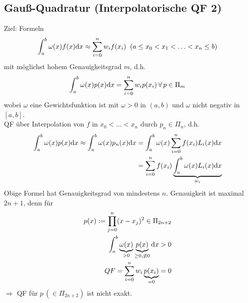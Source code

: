 \subsection{Gauß-Quadratur (Interpolatorische QF 2)}
Ziel: Formeln
\begin{align*}
  \int_a^b \omega(x) f(x) \mathrm{d}x \approx \sum\limits_{i=0}^{n}{w_i f(x_i)}\;\;(a \leq x_0 < x_1 < \ldots < x_n \leq b)
\end{align*}
mit möglichst hohem Genauigkeitsgrad $m$, d.h. 
\begin{align*}
  \int_a^b \omega(x) p(x) \mathrm{d}x = \sum\limits_{i=0}^{n}{w_i p(x_i)}\,\forall\, p \in \Pi_m
\end{align*}
wobei $\omega$ eine Gewichtsfunktion ist mit $\omega > 0$ in $(a,b)$ und $\omega$ nicht negativ in $[a,b]$.\\
QF über Interpolation von $f$ in $x_0 < \ldots < x_n$ durch $p_n \in \Pi_n$, d.h.
\begin{align*}
  \int_a^b \omega(x) p(x) \mathrm{d}x \approx \int_a^b \omega(x) p_n(x) \mathrm{d}x &= \int_a^b \omega(x) \sum\limits_{i=0}^{n}{f(x_i)L_i(x) \mathrm{d}x} \\
  &= \sum\limits_{i=0}^{n}{ f(x_i) \underbrace{\int_a^b \omega(x) L_i(x) \mathrm{d}x}_{w_i}}
\end{align*}
Obige Formel hat Genauigkeitsgrad von mindestens $n$. Genauigkeit ist maximal $2n+1$, denn für
\begin{align*}
  p(x) := \prod_{j=0}^n (x-x_j)^2 \in \Pi_{2n+2} \\
  \int_a^b \underbrace{\omega(x)}_{>0} \underbrace{p(x)}_{\geq 0,\not \equiv 0} \mathrm{d}x > 0\\
  QF = \sum\limits_{i=0}^{n}{w}_i \underbrace{p(x_i)}_{=0} = 0
\end{align*}
$\Rightarrow$ QF für $p\,(\in \Pi_{2n+2})$ ist nicht exakt.
